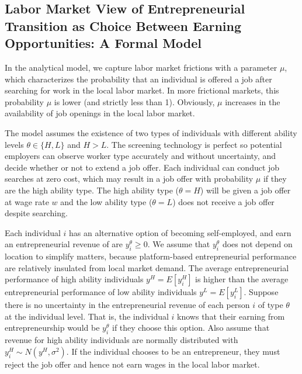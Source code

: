 \documentclass[letterpaper,12pt]{article}
\begin{document}
\subsection{Labor Market View of Entrepreneurial Transition as Choice Between Earning Opportunities: A Formal Model}

In the analytical model, we capture labor market frictions with a parameter $\mu$, which characterizes the probability that an individual is offered a job after searching for work in the local labor market. In more frictional markets, this probability $\mu$ is lower (and strictly less than 1). Obviously, $\mu$ increases in the availability of job openings in the local labor market.




The model assumes the existence of two types of individuals with different ability levels $\theta\in\{H,L\}$ and $H>L$. The screening technology is perfect so potential employers can observe worker type accurately and without uncertainty, and decide whether or not to extend a job offer. Each individual can conduct job searches at zero cost, which may result in a job offer with probability $\mu$ if they are the high ability type. The high ability type ($\theta=H$) will be given a job offer at wage rate $w$ and the low ability type ($\theta=L$) does not receive a job offer despite searching. 


Each individual $i$ has an alternative option of becoming self-employed, and earn an entrepreneurial revenue of are $y^{\theta}_{i}\geq 0$. We assume that $y^{\theta}_{i}$ does not depend on location to simplify matters, because platform-based entrepreneurial performance are relatively insulated from local market demand. The average entrepreneurial performance of high ability individuals $y^{H}=E[y^{H}_{i}]$ is higher than the average entrepreneurial performance of low ability individuals $y^{L}=E[y^{L}_{i}]$. Suppose there is no uncertainty in the entrepreneurial revenue of each person $i$ of type $\theta$ at the individual level. That is, the individual $i$ knows that their earning from entrepreneurship would be $y^{\theta}_{i}$ if they choose this option. Also assume that revenue for high ability individuals are normally distributed with $y^{H}_{i}\sim N(y^{H},\sigma^{2})$. If the individual chooses to be an entrepreneur, they must reject the job offer and hence not earn wages in the local labor market.
\end{document}
